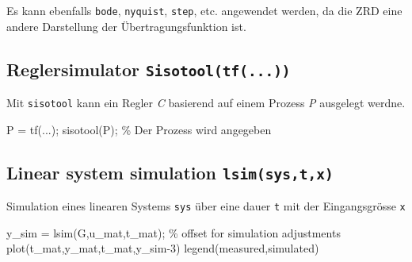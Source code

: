 \documentclass[
  10pt,
  a4paper,
  twocolumn]{article}
\newenvironment{Shaded}{}{}
\newcommand{\CommentTok}[1]{\textcolor[rgb]{0.42,0.45,0.49}{#1}}
\newcommand{\FloatTok}[1]{\textcolor[rgb]{0.00,0.36,0.77}{#1}}
\newcommand{\NormalTok}[1]{\textcolor[rgb]{0.14,0.16,0.18}{#1}}
\newcommand{\OperatorTok}[1]{\textcolor[rgb]{0.14,0.16,0.18}{#1}}
\newcommand{\SpecialStringTok}[1]{\textcolor[rgb]{0.01,0.18,0.38}{#1}}
\newcommand{\VariableTok}[1]{\textcolor[rgb]{0.89,0.38,0.04}{#1}}
\numberwithin{equation}{section}
\begin{document}
Es kann ebenfalls \texttt{bode}, \texttt{nyquist}, \texttt{step}, etc.
angewendet werden, da die ZRD eine andere Darstellung der
Übertragungsfunktion ist.

\hypertarget{reglersimulator-sisotooltf...}{%
\subsection{\texorpdfstring{Reglersimulator
\texttt{Sisotool(tf(...))}}{Reglersimulator Sisotool(tf(...))}}\label{reglersimulator-sisotooltf...}}

Mit \texttt{sisotool} kann ein Regler \emph{C} basierend auf einem
Prozess \emph{P} ausgelegt werdne.

\begin{Shaded}
\begin{Highlighting}[]
\VariableTok{P} \OperatorTok{=} \VariableTok{tf}\NormalTok{(}\OperatorTok{...}\NormalTok{)}\OperatorTok{;}
\VariableTok{sisotool}\NormalTok{(}\VariableTok{P}\NormalTok{)}\OperatorTok{;} \CommentTok{\% Der Prozess wird angegeben}
\end{Highlighting}
\end{Shaded}

\hypertarget{linear-system-simulation-lsimsystx}{%
\subsection{\texorpdfstring{Linear system simulation
\texttt{lsim(sys,t,x)}}{Linear system simulation lsim(sys,t,x)}}\label{linear-system-simulation-lsimsystx}}

Simulation eines linearen Systems \texttt{sys} über eine dauer
\texttt{t} mit der Eingangsgrösse \texttt{x}

\begin{Shaded}
\begin{Highlighting}[]
\VariableTok{y\_sim} \OperatorTok{=} \VariableTok{lsim}\NormalTok{(}\VariableTok{G}\OperatorTok{,}\VariableTok{u\_mat}\OperatorTok{,}\VariableTok{t\_mat}\NormalTok{)}\OperatorTok{;}
\CommentTok{\% offset for simulation adjustments}
\VariableTok{plot}\NormalTok{(}\VariableTok{t\_mat}\OperatorTok{,}\VariableTok{y\_mat}\OperatorTok{,}\VariableTok{t\_mat}\OperatorTok{,}\VariableTok{y\_sim}\OperatorTok{{-}}\FloatTok{3}\NormalTok{)}
\VariableTok{legend}\NormalTok{(}\SpecialStringTok{\textquotesingle{}measured\textquotesingle{}}\OperatorTok{,}\SpecialStringTok{\textquotesingle{}simulated\textquotesingle{}}\NormalTok{)}
\end{Highlighting}
\end{Shaded}
\end{document}

